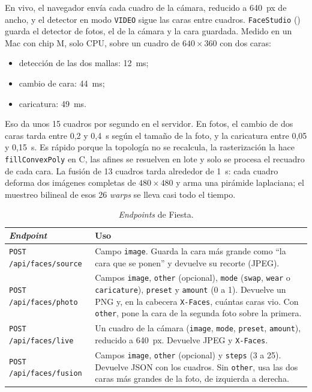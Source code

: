 En vivo, el navegador envía cada cuadro de la cámara, reducido a 640~px de ancho, y el detector en modo \texttt{VIDEO} sigue las caras entre cuadros. \texttt{FaceStudio} () guarda el detector de fotos, el de la cámara y la cara guardada. Medido en un Mac con chip M, solo CPU, sobre un cuadro de $640\times360$ con dos caras:
\begin{itemize}
  \item detección de las dos mallas: 12~ms;
  \item cambio de cara: 44~ms;
  \item caricatura: 49~ms.
\end{itemize}
Eso da unos 15 cuadros por segundo en el servidor. En fotos, el cambio de dos caras tarda entre 0{,}2 y 0{,}4~s según el tamaño de la foto, y la caricatura entre 0{,}05 y 0{,}15~s. Es rápido porque la topología no se recalcula, la rasterización la hace \texttt{fillConvexPoly} en C, las afines se resuelven en lote y solo se procesa el recuadro de cada cara. La fusión de 13 cuadros tarda alrededor de 1~s: cada cuadro deforma dos imágenes completas de $480\times480$ y arma una pirámide laplaciana; el muestreo bilineal de esos 26 \emph{warps} se lleva casi todo el tiempo.

\begin{table}[ht]
\centering
\small
\begin{tabularx}{\linewidth}{@{}l X@{}}
\toprule
\emph{Endpoint} & Uso \\
\midrule
\texttt{POST /api/faces/source} & Campo \texttt{image}. Guarda la cara más grande como ``la cara que se ponen'' y devuelve su recorte (JPEG). \\
\texttt{POST /api/faces/photo} & Campos \texttt{image}, \texttt{other} (opcional), \texttt{mode} (\texttt{swap}, \texttt{wear} o \texttt{caricature}), \texttt{preset} y \texttt{amount} (0 a 1). Devuelve un PNG y, en la cabecera \texttt{X-Faces}, cuántas caras vio. Con \texttt{other}, pone la cara de la segunda foto sobre la primera. \\
\texttt{POST /api/faces/live} & Un cuadro de la cámara (\texttt{image}, \texttt{mode}, \texttt{preset}, \texttt{amount}), reducido a 640~px. Devuelve JPEG y \texttt{X-Faces}. \\
\texttt{POST /api/faces/fusion} & Campos \texttt{image}, \texttt{other} (opcional) y \texttt{steps} (3 a 25). Devuelve JSON con los cuadros. Sin \texttt{other}, usa las dos caras más grandes de la foto, de izquierda a derecha. \\
\bottomrule
\end{tabularx}
\caption{\emph{Endpoints} de Fiesta.}
\label{tab:api-fiesta}
\end{table}

